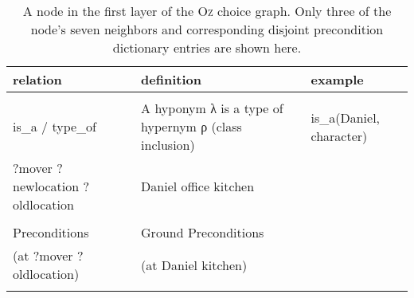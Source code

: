 \begin{table}
  \centering
    \begin{tabular}{ l l l }
	relation & definition & example \\
	\hline
    \hline \\
    is\_a / type\_of & A hyponym λ is a type of hypernym ρ (class inclusion) & is\_a(Daniel, character)\\
    \hline
    ?mover ?newlocation ?oldlocation & Daniel office kitchen &\\ \\
    Preconditions & Ground Preconditions &\\
    \hline
    (at ?mover ?oldlocation) & (at Daniel kitchen) \\ \\
    \end{tabular}
  \caption{A node in the first layer of the \textsc{Oz} choice graph. Only three of the node's seven neighbors and corresponding disjoint precondition dictionary entries are shown here.}
  \label{PDDLActions}
\end{table}
